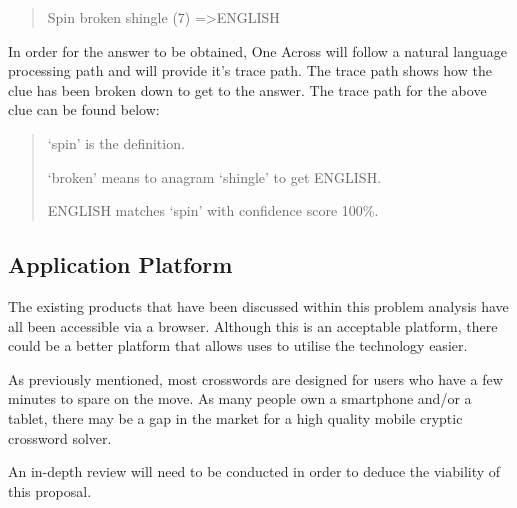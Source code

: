\begin{quote}
Spin broken shingle (7) =\textgreater  ENGLISH
\end{quote}

In order for the answer to be obtained, One Across will follow a natural 
language processing path and will provide it’s trace path. The trace path shows
how the clue has been broken down to get to the answer. The trace path for the 
above clue can be found below:

\begin{quote}
`spin' is the definition.

`broken' means to anagram `shingle' to get ENGLISH.

ENGLISH matches `spin' with confidence score 100\%.
\end{quote}

\subsection{Application Platform}

The existing products that have been discussed within this problem analysis 
have all been accessible via a browser. Although this is an acceptable 
platform, there could be a better platform that allows uses to utilise the 
technology easier.

As previously mentioned, most crosswords are designed for users who have a few 
minutes to spare on the move. As many people own a smartphone and/or a tablet, 
there may be a gap in the market for a high quality mobile cryptic crossword 
solver.

An in-depth review will need to be conducted in order to deduce the viability 
of this proposal.
